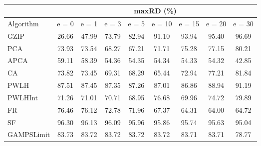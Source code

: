 \begin{table}[h]
\newcommand{\cpca}{\cellcolor{cyan!20}}
\newcommand{\capca}{\cellcolor{green!20}}
\newcommand{\cfr}{\cellcolor{yellow!25}}
\newcommand{\cgzip}{\cellcolor{orange!20}}
\newcommand{\best}{\cellcolor{gray!30}}
\centering\hspace*{0cm}\begin{tabular}{| l | c | c | c | c | c | c | c | c |}\cline{2-9}\multicolumn{1}{c|}{}& \multicolumn{8}{c|}{maxRD (\%)}\\\hline
{Algorithm} & {e = 0} & {e = 1} & {e = 3} & {e = 5} & {e = 10} & {e = 15} & {e = 20} & {e = 30} \\\hline
{GZIP\cgzip} & {\best26.66} & {\best47.99} & {73.79} & {82.94} & {91.10} & {93.94} & {95.40} & {96.69} \\\hline
{PCA\cpca} & {73.93} & {73.54} & {68.27} & {67.21} & {71.71} & {75.28} & {77.15} & {80.21} \\\hline
{APCA\capca} & {59.11} & {58.39} & {\best54.36} & {\best54.35} & {\best54.34} & {\best54.33} & {\best54.32} & {\best42.85} \\\hline
{CA} & {73.82} & {73.45} & {69.31} & {68.29} & {65.44} & {72.94} & {77.21} & {81.84} \\\hline
{PWLH} & {87.51} & {87.45} & {87.35} & {87.26} & {87.01} & {86.86} & {88.94} & {91.19} \\\hline
{PWLHInt} & {71.26} & {71.01} & {70.71} & {68.95} & {76.68} & {69.96} & {74.72} & {79.89} \\\hline
{FR\cfr} & {76.46} & {76.12} & {72.78} & {71.96} & {67.37} & {64.31} & {64.00} & {64.72} \\\hline
{SF} & {96.30} & {96.13} & {96.09} & {95.96} & {95.86} & {95.74} & {95.63} & {95.04} \\\hline
{GAMPSLimit} & {83.73} & {83.72} & {83.72} & {83.72} & {83.72} & {83.71} & {83.71} & {78.77} \\\hline
\end{tabular}
\caption{\captionminmax}
\label{experiments:minmax}
\end{table}
